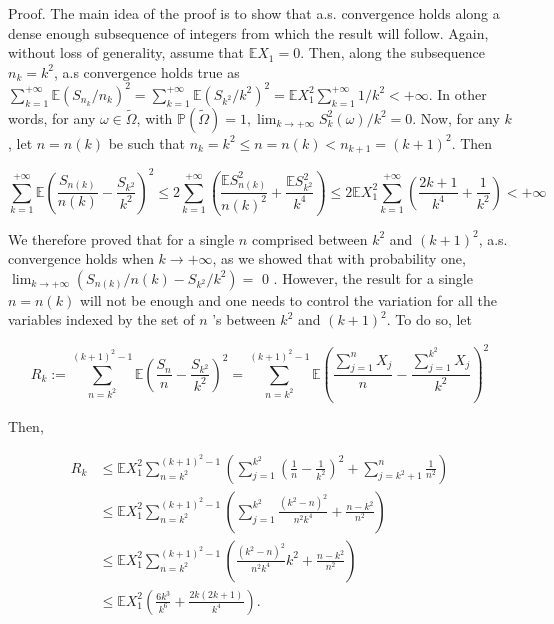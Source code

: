 \documentclass{amsbook}
\theoremstyle{plain}%
\theoremstyle{definition}
\theoremstyle{remark}
\begin{document}
    Proof. The main idea of the proof is to show that a.s. convergence holds along a dense enough subsequence of integers from which the result will follow. Again, without loss of generality, assume that $\mathbb{E} X_{1}=0$. Then, along the subsequence $n_{k}=k^{2}$, a.s convergence holds true as $\sum_{k=1}^{+\infty} \mathbb{E}\left(S_{n_{k}} / n_{k}\right)^{2}=\sum_{k=1}^{+\infty} \mathbb{E}\left(S_{k^{2}} / k^{2}\right)^{2}=\mathbb{E} X_{1}^{2} \sum_{k=1}^{+\infty} 1 / k^{2}<+\infty$. In other words, for any $\omega \in \widetilde{\Omega}$, with $\mathbb{P}(\widetilde{\Omega})=1, \lim _{k \rightarrow+\infty} S_{k}^{2}(\omega) / k^{2}=0$. Now, for any $k$, let $n=n(k)$ be such that $n_{k}=k^{2} \leq n=n(k)<n_{k+1}=(k+1)^{2}$. Then

    $$
    \sum_{k=1}^{+\infty} \mathbb{E}\left(\frac{S_{n(k)}}{n(k)}-\frac{S_{k^{2}}}{k^{2}}\right)^{2} \leq 2 \sum_{k=1}^{+\infty}\left(\frac{\mathbb{E} S_{n(k)}^{2}}{n(k)^{2}}+\frac{\mathbb{E} S_{k^{2}}^{2}}{k^{4}}\right) \leq 2 \mathbb{E} X_{1}^{2} \sum_{k=1}^{+\infty}\left(\frac{2 k+1}{k^{4}}+\frac{1}{k^{2}}\right)<+\infty
    $$

    We therefore proved that for a single $n$ comprised between $k^{2}$ and $(k+1)^{2}$, a.s. convergence holds when $k \rightarrow+\infty$, as we showed that with probability one, $\lim _{k \rightarrow+\infty}\left(S_{n(k)} / n(k)-S_{k^{2}} / k^{2}\right)=$ 0 . However, the result for a single $n=n(k)$ will not be enough and one needs to control the variation for all the variables indexed by the set of $n$ 's between $k^{2}$ and $(k+1)^{2}$. To do so, let

    $$
    R_{k}:=\sum_{n=k^{2}}^{(k+1)^{2}-1} \mathbb{E}\left(\frac{S_{n}}{n}-\frac{S_{k^{2}}}{k^{2}}\right)^{2}=\sum_{n=k^{2}}^{(k+1)^{2}-1} \mathbb{E}\left(\frac{\sum_{j=1}^{n} X_{j}}{n}-\frac{\sum_{j=1}^{k^{2}} X_{j}}{k^{2}}\right)^{2}
    $$

    Then,

    $$
    \begin{aligned}
      R_{k} & \leq \mathbb{E} X_{1}^{2} \sum_{n=k^{2}}^{(k+1)^{2}-1}\left(\sum_{j=1}^{k^{2}}\left(\frac{1}{n}-\frac{1}{k^{2}}\right)^{2}+\sum_{j=k^{2}+1}^{n} \frac{1}{n^{2}}\right) \\
      & \leq \mathbb{E} X_{1}^{2} \sum_{n=k^{2}}^{(k+1)^{2}-1}\left(\sum_{j=1}^{k^{2}} \frac{\left(k^{2}-n\right)^{2}}{n^{2} k^{4}}+\frac{n-k^{2}}{n^{2}}\right)               \\
      & \leq \mathbb{E} X_{1}^{2} \sum_{n=k^{2}}^{(k+1)^{2}-1}\left(\frac{\left(k^{2}-n\right)^{2}}{n^{2} k^{4}} k^{2}+\frac{n-k^{2}}{n^{2}}\right)                            \\
      & \leq \mathbb{E} X_{1}^{2}\left(\frac{6 k^{3}}{k^{6}}+\frac{2 k(2 k+1)}{k^{4}}\right) .
    \end{aligned}
    $$
\end{document}
